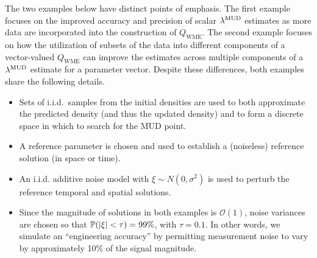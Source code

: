 The two examples below have distinct points of emphasis.
The first example focuses on the improved accuracy and precision of scalar $\lambda^{\text{MUD}}$ estimates as more data are incorporated into the construction of $Q_\text{WME}$.
The second example focuses on how the utilization of subsets of the data into different components of a vector-valued $Q_\text{WME}$ can improve the estimates across multiple components of a $\lambda^{\text{MUD}}$ estimate for a parameter vector.
Despite these differences, both examples share the following details.
\begin{itemize}
  \item Sets of i.i.d.~samples from the initial densities are used to both approximate the predicted density (and thus the updated density) and to form a discrete space in which to search for the MUD point.
  \item A reference parameter is chosen and used to establish a (noiseless) reference solution (in space or time).
  \item An i.i.d. additive noise model with $\xi \sim N(0,\sigma^2)$ is used to perturb the reference temporal and spatial solutions.
  \item Since the magnitude of solutions in both examples is $\mathcal{O}(1)$, noise variances are chosen so that $\mathbb{P}( \left\vert\xi\right\vert < \tau ) = 99\%$, with $\tau=0.1$. In other words, we simulate an ``engineering accuracy'' by permitting measurement noise to vary by  approximately 10\% of the signal magnitude.
\end{itemize}



